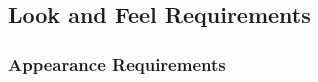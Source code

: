 \documentclass[12pt]{article}
\newcommand{\todo}[1]{\textcolor{red}{[TODO: #1]}} \else
\newcommand{\authornote}[3]{} \newcommand{\todo}[1]{} \fi
\newcommand{\ds}[1]{\authornote{blue}{DS}{#1}} %
\newcommand{\mmp}[1]{\authornote{green}{MP}{#1}}
\newcommand{\vr}[1]{\authornote{green}{VR}{#1}}
\newcounter{ReqNumCounter}
\newcommand{\requirement}[8]{%
\fbox{\parbox{\textwidth}{%
\parbox[t]{.333\textwidth}{\raggedright%
\textbf{Req. \#}: \refstepcounter{ReqNumCounter} \arabic{ReqNumCounter} \label{#1}}%
\parbox[t]{.333\textwidth}{\centering%
\textbf{Req. Type}: \ref{#2}}%
\parbox[t]{.333\textwidth}{\raggedleft%
\textbf{Use Case \#}: \ref{#3}}
\newline\\
\textbf{Description}: #4\\\\
\textbf{Rationale}: #5\\\\
\textbf{Fit Criterion}: #6\\\\
\textbf{Priority}: #7 \hfill \textbf{History}: #8
}}}
\begin{document}
\mmp{Removed this requirement. Anyone using this software will know if they have a compatible GPU}

\mmp{Removed for same reason }


\subsection{Look and Feel Requirements}\label{ReqType_Look} %
\subsubsection{Appearance Requirements}
\ds{Then why does your 4.1.b diagram show ``Visualizations rendered and stored?"}\vr{Revised Figure 1 to remove visualization.}
\end{document}
